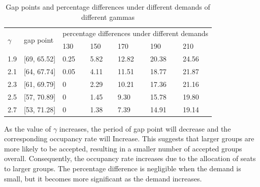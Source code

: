 \begin{table}[ht]
  \centering
  \caption{Gap points and percentage differences under different demands of different gammas}
\begin{tabular}{lllllll}
  \hline
  \multicolumn{1}{|l|}{\multirow{2}{*}{$\gamma$}} & \multicolumn{1}{l|}{\multirow{2}{*}{gap point}} & \multicolumn{5}{l|}{percentage differences under different demands}   \\ 
  \cline{3-7} 
  \multicolumn{1}{|l|}{}                      & \multicolumn{1}{l|}{}                    & \multicolumn{1}{l|}{130} & \multicolumn{1}{l|}{150} & \multicolumn{1}{l|}{170} & \multicolumn{1}{l|}{190} & \multicolumn{1}{l|}{210} \\ 
  \hline
  \multicolumn{1}{|l|}{1.9}  & \multicolumn{1}{l|}{[69, 65.52]}  & \multicolumn{1}{l|}{0.25}  & \multicolumn{1}{l|}{5.82}  & \multicolumn{1}{l|}{12.82} & \multicolumn{1}{l|}{20.38} & \multicolumn{1}{l|}{24.56} \\ 
  \hline                                    
  \multicolumn{1}{|l|}{2.1}  & \multicolumn{1}{l|}{[64, 67.74]}  & \multicolumn{1}{l|}{0.05}  & \multicolumn{1}{l|}{4.11}  & \multicolumn{1}{l|}{11.51} & \multicolumn{1}{l|}{18.77} & \multicolumn{1}{l|}{21.87} \\ 
  \hline           
  \multicolumn{1}{|l|}{2.3}  & \multicolumn{1}{l|}{[61, 69.79]}  & \multicolumn{1}{l|}{0}  & \multicolumn{1}{l|}{2.29}  & \multicolumn{1}{l|}{10.21} & \multicolumn{1}{l|}{17.36} & \multicolumn{1}{l|}{21.16} \\ 
  \hline           
  \multicolumn{1}{|l|}{2.5}  & \multicolumn{1}{l|}{[57, 70.89]}  & \multicolumn{1}{l|}{0}  & \multicolumn{1}{l|}{1.45}  & \multicolumn{1}{l|}{9.30} & \multicolumn{1}{l|}{15.78} & \multicolumn{1}{l|}{19.80} \\ 
  \hline          
  \multicolumn{1}{|l|}{2.7}  & \multicolumn{1}{l|}{[53, 71.28]}  & \multicolumn{1}{l|}{0}  & \multicolumn{1}{l|}{1.38}  & \multicolumn{1}{l|}{7.39} & \multicolumn{1}{l|}{14.91} & \multicolumn{1}{l|}{19.14} \\ 
  \hline            
\end{tabular}
\end{table}


As the value of $\gamma$ increases, the period of gap point will decrease and the corresponding occupancy rate will Increase. This suggests that larger groups are more likely to be accepted, resulting in a smaller number of accepted groups overall. Consequently, the occupancy rate increases due to the allocation of seats to larger groups. The percentage difference is negligible when the demand is small, but it becomes more significant as the demand increases.


